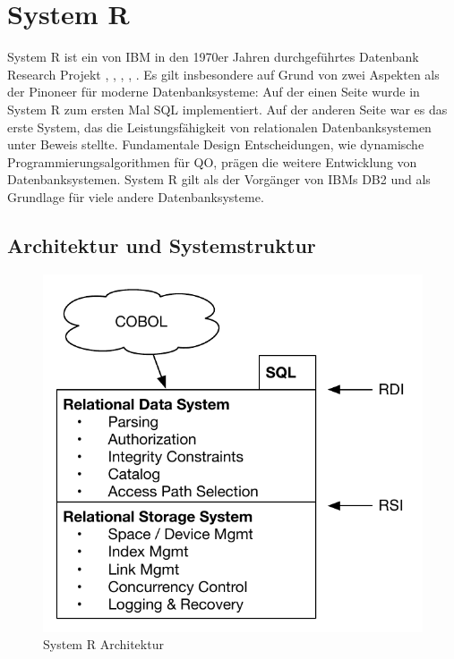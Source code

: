 \section{System R}

System R ist ein von IBM in den 1970er Jahren durchgeführtes Datenbank Research Projekt \cite{selinger1979access}, \cite{wade2012ibm}, \cite{chamberlin1981history}, \cite{astrahan1976system}, \cite{astrahan1978system}. Es gilt insbesondere auf Grund von zwei Aspekten als der Pinoneer für moderne Datenbanksysteme: Auf der einen Seite wurde in System R zum ersten Mal \ac{SQL} implementiert. Auf der anderen Seite war es das erste System, das die Leistungsfähigkeit von relationalen Datenbanksystemen unter Beweis stellte. Fundamentale Design Entscheidungen, wie dynamische Programmierungsalgorithmen für \ac{QO}, prägen die weitere Entwicklung von Datenbanksystemen. System R gilt als der Vorgänger von IBMs DB2 und als Grundlage für viele andere Datenbanksysteme.


\subsection{Architektur und Systemstruktur}

\begin{figure}[h]
  \centering
  \includegraphics{03_Related_Work/SystemR.pdf}
  \caption{System R Architektur \cite{astrahan1976system} \cite{astrahan1978system}}
  \label{SystemRArchitecture}
\end{figure}


